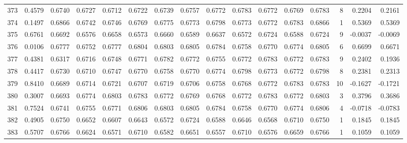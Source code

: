 \begin{tabular}{lrrrrrrrrrrrrrrr}
373 &      0.4579 &  0.6740 &  0.6727 &  0.6712 &  0.6722 &  0.6739 &  0.6757 &  0.6772 &  0.6783 &  0.6772 &   0.6769 &     0.6783 &      8 &                    0.2204 &                     0.2161 \\
374 &      0.1497 &  0.6866 &  0.6742 &  0.6746 &  0.6769 &  0.6775 &  0.6773 &  0.6798 &  0.6773 &  0.6772 &   0.6783 &     0.6866 &      1 &                    0.5369 &                     0.5369 \\
375 &      0.6761 &  0.6692 &  0.6576 &  0.6658 &  0.6573 &  0.6660 &  0.6589 &  0.6637 &  0.6572 &  0.6724 &   0.6588 &     0.6724 &      9 &                   -0.0037 &                    -0.0069 \\
376 &      0.0106 &  0.6777 &  0.6752 &  0.6777 &  0.6804 &  0.6803 &  0.6805 &  0.6784 &  0.6758 &  0.6770 &   0.6774 &     0.6805 &      6 &                    0.6699 &                     0.6671 \\
377 &      0.4381 &  0.6317 &  0.6716 &  0.6748 &  0.6771 &  0.6782 &  0.6772 &  0.6755 &  0.6772 &  0.6783 &   0.6772 &     0.6783 &      9 &                    0.2402 &                     0.1936 \\
378 &      0.4417 &  0.6730 &  0.6710 &  0.6747 &  0.6770 &  0.6758 &  0.6770 &  0.6774 &  0.6798 &  0.6773 &   0.6772 &     0.6798 &      8 &                    0.2381 &                     0.2313 \\
379 &      0.8410 &  0.6689 &  0.6714 &  0.6721 &  0.6707 &  0.6719 &  0.6706 &  0.6758 &  0.6768 &  0.6772 &   0.6783 &     0.6783 &     10 &                   -0.1627 &                    -0.1721 \\
380 &      0.3007 &  0.6693 &  0.6774 &  0.6803 &  0.6783 &  0.6772 &  0.6769 &  0.6768 &  0.6772 &  0.6783 &   0.6772 &     0.6803 &      3 &                    0.3796 &                     0.3686 \\
381 &      0.7524 &  0.6741 &  0.6755 &  0.6771 &  0.6806 &  0.6803 &  0.6805 &  0.6784 &  0.6758 &  0.6770 &   0.6774 &     0.6806 &      4 &                   -0.0718 &                    -0.0783 \\
382 &      0.4905 &  0.6750 &  0.6652 &  0.6607 &  0.6643 &  0.6572 &  0.6724 &  0.6588 &  0.6646 &  0.6568 &   0.6710 &     0.6750 &      1 &                    0.1845 &                     0.1845 \\
383 &      0.5707 &  0.6766 &  0.6624 &  0.6571 &  0.6710 &  0.6582 &  0.6651 &  0.6557 &  0.6710 &  0.6576 &   0.6659 &     0.6766 &      1 &                    0.1059 &                     0.1059 \\

\end{tabular}
